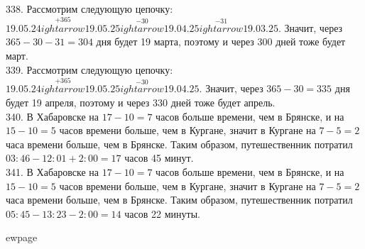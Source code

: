 338. Рассмотрим следующую цепочку: $19.05.24\stackrel{+365}{
ightarrow}19.05.25\stackrel{-30}{
ightarrow}19.04.25
\stackrel{-31}{
ightarrow}19.03.25.$ Значит, через $365-30-31=304$ дня будет 19 марта, поэтому и через 300 дней тоже будет март.\\
339. Рассмотрим следующую цепочку: $19.05.24\stackrel{+365}{
ightarrow}19.05.25\stackrel{-30}{
ightarrow}19.04.25.$ Значит, через $365-30=335$ дня будет 19 апреля, поэтому и через 330 дней тоже будет апрель.\\
340. В Хабаровске на $17-10=7$ часов больше времени, чем в Брянске, и на $15-10=5$ часов времени больше, чем в Кургане, значит в Кургане на $7-5=2$ часа времени больше, чем в Брянске. Таким образом, путешественник потратил
$03:46-12:01+2:00=17$ часов 45 минут.\\
341. В Хабаровске на $17-10=7$ часов больше времени, чем в Брянске, и на $15-10=5$ часов времени больше, чем в Кургане, значит в Кургане на $7-5=2$ часа времени больше, чем в Брянске. Таким образом, путешественник потратил
$05:45-13:23-2:00=14$ часов 22 минуты.

ewpage
